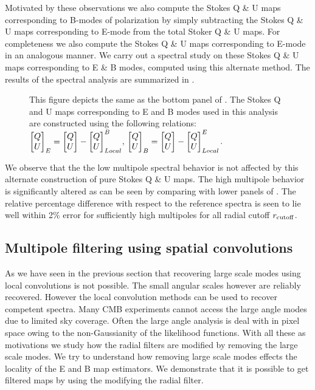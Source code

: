 Motivated by these observations we also compute the Stokes Q \& U maps corresponding to B-modes of polarization by simply subtracting the Stokes Q \& U maps corresponding to E-mode from the total Stoker Q \& U maps. For completeness we also compute the Stokes Q \& U maps corresponding to E-mode in an analogous manner. We carry out a spectral study on these Stokes Q \& U maps corresponding to E \& B modes, computed using this alternate method. The results of the spectral analysis are summarized in .
%
\begin{figure}[!t] 
\centering
\caption{This figure depicts the same as the bottom panel of . The Stokes Q and U maps corresponding to E and B modes used in this analysis are constructed using the following relations: $\begin{bmatrix} Q \\ U \end{bmatrix}_{E}=\begin{bmatrix} Q \\ U \end{bmatrix}-\begin{bmatrix} Q \\ U \end{bmatrix}_{Local}^B$, $\begin{bmatrix} Q \\ U \end{bmatrix}_{B}=\begin{bmatrix} Q \\ U \end{bmatrix}-\begin{bmatrix} Q \\ U \end{bmatrix}_{Local}^{E}$.}
\label{fig:dbqu-spectra_rad_cutoff}
\end{figure}
%
We observe that the the low multipole spectral behavior is not affected by this alternate construction of pure Stokes Q \& U maps. The high multipole behavior is significantly altered as can be seen by comparing  with lower panels of . The relative percentage difference with respect to the reference spectra is seen to lie well within 2\% error for sufficiently high multipoles for all radial cutoff $r_{\rm cutoff}$.
\subsection{Multipole filtering using spatial convolutions}
As we have seen in the previous section that recovering large scale modes using local convolutions is not possible. The small angular scales however are reliably recovered. However the local convolution methods can be used to recover competent spectra. 
Many CMB experiments cannot access the large angle modes due to limited sky coverage. Often the large angle analysis is deal with in pixel space owing to the non-Gaussianity of the likelihood functions. With all these as motivations we study how the radial filters are modified by removing the large scale modes. We try to understand how removing large scale modes effects the locality of the E and B map estimators. We demonstrate that it is possible to get filtered maps by using the modifying the radial filter. 
